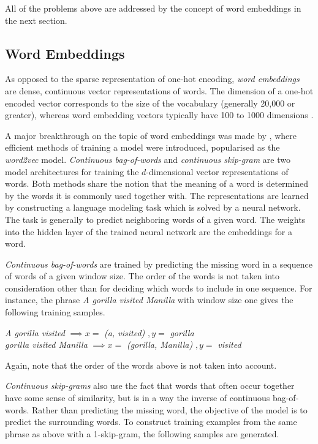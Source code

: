 All of the problems above are addressed by the concept of word embeddings in the next section. 

\subsection{Word Embeddings}
As opposed to the sparse representation of one-hot encoding, \textit{word embeddings} are dense, continuous vector representations of words. The dimension of a one-hot encoded vector corresponds to the size of the vocabulary (generally 20,000 or greater), whereas word embedding vectors typically have 100 to 1000 dimensions \citep{chollet2017deep}.

A major breakthrough on the topic of word embeddings was made by \citet{mikolov2013efficient}, where efficient methods of training a model were introduced, popularised as the \textit{word2vec} model. \textit{Continuous bag-of-words} and \textit{continuous skip-gram} are two model architectures for training the $d$-dimensional vector representations of words. Both methods share the notion that the meaning of a word is determined by the words it is commonly used together with. The representations are learned by constructing a language modeling task which is solved by a neural network. The task is generally to predict neighboring words of a given word. The weights into the hidden layer of the trained neural network are the embeddings for a word. 

\textit{Continuous bag-of-words} are trained by predicting the missing word in a sequence of words of a given window size. The order of the words is not taken into consideration other than for deciding which words to include in one sequence. For instance, the phrase \textit{A gorilla visited Manilla} with window size one gives the following training samples.
\begin{center}
\textit{A gorilla visited} $\implies x = $ \textit{(a, visited)} $,y = $ \textit{gorilla} \\ \vspace{1em}
\textit{gorilla visited Manilla} $\implies x = $ \textit{(gorilla, Manilla)} $,y = $ \textit{visited} \\
\end{center}

Again, note that the order of the words above is not taken into account.

\textit{Continuous skip-grams} also use the fact that words that often occur together have some sense of similarity, but is in a way the inverse of continuous bag-of-words. Rather than predicting the missing word, the objective of the model is to predict the surrounding words. To construct training examples from the same phrase as above with a 1-skip-gram, the following samples are generated. 

